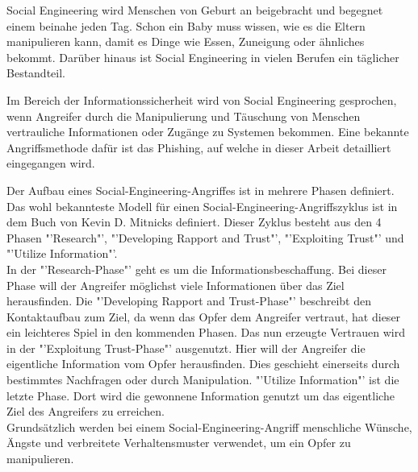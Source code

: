 	Social Engineering wird Menschen von Geburt an beigebracht und begegnet einem beinahe jeden Tag. Schon ein Baby muss wissen, wie es die Eltern manipulieren kann, damit es Dinge wie Essen, Zuneigung oder ähnliches bekommt. Darüber hinaus ist Social Engineering in vielen Berufen ein täglicher Bestandteil. %
	
	Im Bereich der Informationssicherheit wird von Social Engineering gesprochen, wenn Angreifer durch die Manipulierung und Täuschung von Menschen vertrauliche Informationen oder Zugänge zu Systemen bekommen. Eine bekannte Angriffsmethode dafür ist das Phishing, auf welche in dieser Arbeit detailliert eingegangen wird.

	Der Aufbau eines Social-Engineering-Angriffes ist in mehrere Phasen definiert. Das wohl bekannteste Modell für einen Social-Engineering-Angriffszyklus ist in dem Buch von Kevin D. Mitnicks \cite{ArtOfDeception} definiert. Dieser Zyklus besteht aus den 4 Phasen "'Research"', "'Developing Rapport and Trust"', "'Exploiting Trust"' und "'Utilize Information"'.\\
	In der "'Research-Phase"' geht es um die Informationsbeschaffung. Bei dieser Phase will der Angreifer möglichst viele Informationen über das Ziel herausfinden. Die "'Developing Rapport and Trust-Phase"' beschreibt den Kontaktaufbau zum Ziel, da wenn das Opfer dem Angreifer vertraut, hat dieser ein leichteres Spiel in den kommenden Phasen. Das nun erzeugte Vertrauen wird in der "'Exploitung Trust-Phase"' ausgenutzt. Hier will der Angreifer die eigentliche Information vom Opfer herausfinden. Dies geschieht einerseits durch bestimmtes Nachfragen oder durch Manipulation.
	"'Utilize Information"' ist die letzte Phase. Dort wird die gewonnene Information genutzt um das eigentliche Ziel des Angreifers zu erreichen.\\
	Grundsätzlich werden bei einem Social-Engineering-Angriff menschliche Wünsche, Ängste und verbreitete Verhaltensmuster verwendet, um ein Opfer zu manipulieren.\cite{LeitfadenSE}\\

